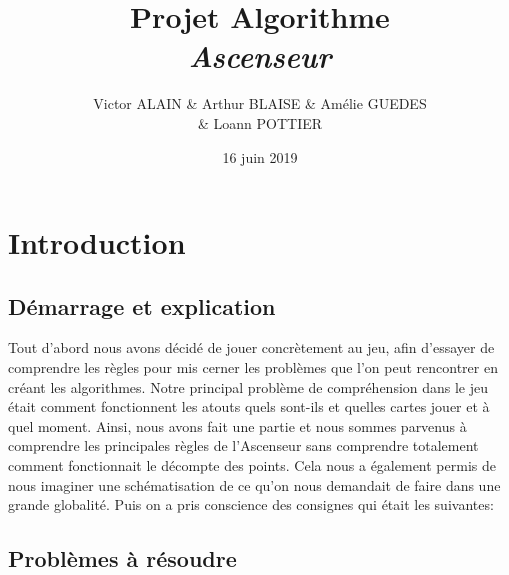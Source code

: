 \documentclass[12pt]{report}
\title{Projet Algorithme \\ \textit{Ascenseur} }
\date{16 juin 2019}
\author{Victor \textsc{ALAIN} \& Arthur \textsc{BLAISE} \& Amélie \textsc{GUEDES} \\ \& Loann \textsc{POTTIER}}
\begin{document}
\maketitle
\tableofcontents

\clearpage


\section{Introduction}

\subsection{Démarrage et explication}
	Tout d'abord nous avons décidé de jouer concrètement au jeu, afin d'essayer de comprendre les règles pour mis cerner les problèmes que l'on peut rencontrer en créant les algorithmes. Notre principal problème de compréhension dans le jeu était comment fonctionnent les atouts quels sont-ils et quelles cartes jouer et à quel moment. Ainsi, nous avons fait une partie et nous sommes parvenus à comprendre les principales règles de l'Ascenseur sans comprendre totalement comment fonctionnait le décompte des points. Cela nous a également permis de nous imaginer une schématisation de ce qu'on nous demandait de faire dans une grande globalité. Puis on a pris conscience des consignes qui était les suivantes:
	
\subsection{Problèmes à résoudre}
	
\end{document}
